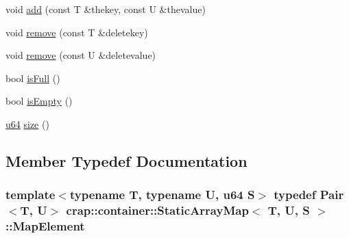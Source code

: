 \begin{DoxyCompactItemize}
void \hyperlink{classcrap_1_1container_1_1_static_array_map_aae9fca42efc1efd42a7bed5ab8182cc8}{add} (const T \&thekey, const U \&thevalue)
\item 
void \hyperlink{classcrap_1_1container_1_1_static_array_map_aaa1e2e238e0e404d72cb323ea1e8d3cb}{remove} (const T \&deletekey)
\item 
void \hyperlink{classcrap_1_1container_1_1_static_array_map_a680c68c0cbaebbcc1392e9ca4536baf3}{remove} (const U \&deletevalue)
\item 
bool \hyperlink{classcrap_1_1container_1_1_static_array_map_a0a765f182a3e0046a012071c057c80f1}{is\-Full} ()
\item 
bool \hyperlink{classcrap_1_1container_1_1_static_array_map_a72e0c3120b14fb70046a06d62d8f0954}{is\-Empty} ()
\item 
\hyperlink{types_8h_a3f7e2bcbb0b4c338f3c4f6c937cd4234}{u64} \hyperlink{classcrap_1_1container_1_1_static_array_map_ae064868196940c699a84b2ed2e230aef}{size} ()
\end{DoxyCompactItemize}


\subsection{Member Typedef Documentation}
\hypertarget{classcrap_1_1container_1_1_static_array_map_aef770c84a2c91625ee6c423672a1f21c}{
\subsubsection[{Map\-Element}]{\setlength{\rightskip}{0pt plus 5cm}template$<$typename T, typename U, u64 S$>$ typedef {\bf Pair}$<$T, U$>$ {\bf crap\-::container\-::\-Static\-Array\-Map}$<$ T, U, S $>$\-::{\bf Map\-Element}}}\label{classcrap_1_1container_1_1_static_array_map_aef770c84a2c91625ee6c423672a1f21c}


